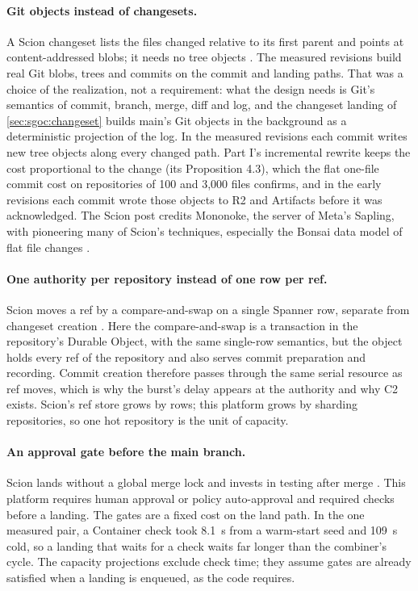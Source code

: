 \documentclass[11pt,letterpaper]{article}
\theoremstyle{definition}
\theoremstyle{remark}
\begin{document}
\paragraph{Git objects instead of changesets.} A Scion changeset lists the files changed relative to its first parent and points at content-addressed blobs; it needs no tree objects \cite{anthropic2026scion}. The measured revisions build real Git blobs, trees and commits on the commit and landing paths. That was a choice of the realization, not a requirement: what the design needs is Git's semantics of commit, branch, merge, diff and log, and the changeset landing of \cref{sec:sgoc:changeset} builds main's Git objects in the background as a deterministic projection of the log. In the measured revisions each commit writes new tree objects along every changed path. Part I's incremental rewrite keeps the cost proportional to the change (its Proposition 4.3), which the flat one-file commit cost on repositories of 100 and 3,000 files confirms, and in the early revisions each commit wrote those objects to R2 and Artifacts before it was acknowledged. %
The Scion post credits Mononoke, the server of Meta's Sapling, with pioneering many of Scion's techniques, especially the Bonsai data model of flat file changes \cite{anthropic2026scion,mononokebonsai}.

\paragraph{One authority per repository instead of one row per ref.} Scion moves a ref by a compare-and-swap on a single Spanner row, separate from changeset creation \cite{anthropic2026scion}. Here the compare-and-swap is a transaction in the repository's Durable Object, with the same single-row semantics, but the object holds every ref of the repository and also serves commit preparation and recording. Commit creation therefore passes through the same serial resource as ref moves, which is why the burst's delay appears at the authority and why C2 exists. Scion's ref store grows by rows; this platform grows by sharding repositories, so one hot repository is the unit of capacity.

\paragraph{An approval gate before the main branch.} Scion lands without a global merge lock and invests in testing after merge \cite{anthropic2026scion}. This platform requires human approval or policy auto-approval and required checks before a landing. The gates are a fixed cost on the land path. In the one measured pair, a Container check took 8.1~s from a warm-start seed and 109~s cold, so a landing that waits for a check waits far longer than the combiner's cycle. %
The capacity projections exclude check time; they assume gates are already satisfied when a landing is enqueued, as the code requires.
\end{document}
